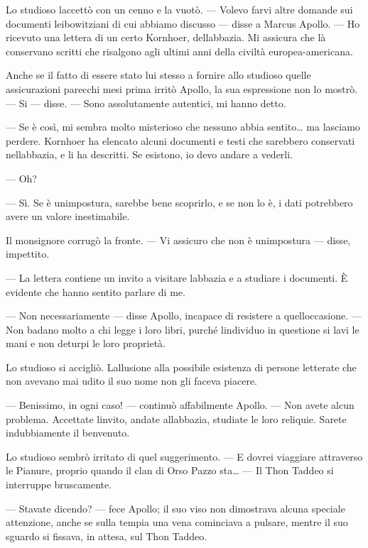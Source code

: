 	Lo studioso l\textquotesingle accettò con un cenno e la vuotò. ---
	Volevo farvi altre domande sui documenti leibowitziani di cui abbiamo
	discusso --- disse a Marcus Apollo. --- Ho ricevuto una lettera di un
	certo Kornhoer, dell\textquotesingle abbazia. Mi assicura che là
	conservano scritti che risalgono agli ultimi anni della civiltà
	europea-americana.
	
	Anche se il fatto di essere stato lui stesso a fornire allo studioso
	quelle assicurazioni parecchi mesi prima irritò Apollo, la sua
	espressione non lo mostrò. --- Si --- disse. --- Sono assolutamente
	autentici, mi hanno detto.
	
	--- Se è così, mi sembra molto misterioso che nessuno abbia
	sentito\ldots{} ma lasciamo perdere. Kornhoer ha elencato alcuni
	documenti e testi che sarebbero conservati nell\textquotesingle abbazia,
	e li ha descritti. Se esistono, io devo andare a vederli.
	
	--- Oh?
	
	--- Sì. Se è un\textquotesingle impostura, sarebbe bene scoprirlo, e se
	non lo è, i dati potrebbero avere un valore inestimabile.
	
	Il monsignore corrugò la fronte. --- Vi assicuro che non è
	un\textquotesingle impostura --- disse, impettito.
	
	--- La lettera contiene un invito a visitare l\textquotesingle abbazia e
	a studiare i documenti. È evidente che hanno sentito parlare di me.
	
	--- Non necessariamente --- disse Apollo, incapace di resistere a
	quell\textquotesingle occasione. --- Non badano molto a chi legge i loro
	libri, purché l\textquotesingle individuo in questione si lavi le mani e
	non deturpi le loro proprietà.
	
	Lo studioso si accigliò. L\textquotesingle allusione alla possibile
	esistenza di persone letterate che non avevano mai udito il suo nome non
	gli faceva piacere.
	
	--- Benissimo, in ogni caso! --- continuò affabilmente Apollo. --- Non
	avete alcun problema. Accettate l\textquotesingle invito, andate
	all\textquotesingle abbazia, studiate le loro reliquie. Sarete
	indubbiamente il benvenuto.
	
	Lo studioso sembrò irritato di quel suggerimento. --- E dovrei viaggiare
	attraverso le Pianure, proprio quando il clan di Orso Pazzo sta\ldots{}
	--- Il Thon Taddeo si interruppe bruscamente.
	
	--- Stavate dicendo? --- fece Apollo; il suo viso non dimostrava alcuna
	speciale attenzione, anche se sulla tempia una vena cominciava a
	pulsare, mentre il suo sguardo si fissava, in attesa, sul Thon Taddeo.
	
